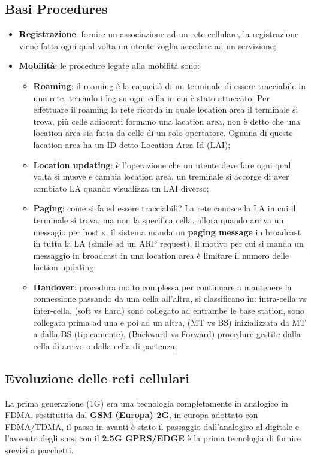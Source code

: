 \documentclass[12pt]{article}
\begin{document}
\subsection{Basi Procedures}
\begin{itemize}
    \item \textbf{Registrazione}: fornire un associazione ad un rete cellulare, la registrazione viene fatta ogni qual volta un utente voglia accedere ad un servizione;
    \item \textbf{Mobilit\`a}: le procedure legate alla mobilit\`a sono:
        \begin{itemize}
            \item \textbf{Roaming}: il roaming \`e la capacit\`a di un terminale di essere tracciabile in una rete, tenendo i log su ogni cella in cui \`e stato attaccato. Per effettuare il roaming la rete ricorda in quale location area il terminale si trova, pi\`u celle adiacenti formano una lacation area, non \`e detto che una location area sia fatta da celle di un solo opertatore. Ognuna di queste lacation area ha un ID detto Location Area Id (LAI);
            \item \textbf{Location updating}: \`e l'operazione che un utente deve fare ogni qual volta si muove e cambia location area, un treminale si accorge di aver cambiato LA quando visualizza un LAI diverso;
            \item \textbf{Paging}: come si fa ed essere tracciabili? La rete conosce la LA in cui il terminale si trova, ma non la specifica cella, allora quando arriva un messagio per host x, il sistema manda un \textbf{paging message} in broadcast in tutta la LA (simile ad un ARP request), il motivo per cui si manda un messaggio in broadcast in una location area \`e limitare il numero delle laction updating;
            \item \textbf{Handover}: procedura molto complessa per continuare a mantenere la connessione passando da una cella all'altra, si classificano in: intra-cella vs inter-cella, (soft vs hard) sono collegato ad entrambe le base station, sono collegato prima ad una e poi ad un altra, (MT vs BS) inizializzata da MT a dalla BS (tipicamente), (Backward vs Forward) procedure gestite dalla cella di arrivo o dalla cella di partenza;
        \end{itemize}
\end{itemize}

\subsection{Evoluzione delle reti cellulari}
La prima generazione (1G) era una tecnologia completamente in analogico in FDMA, sostitutita dal \textbf{GSM (Europa) 2G}, in europa adottato con FDMA/TDMA, il passo in avanti \`e stato il passaggio dall'analogico al digitale e l'avvento degli sms, con il \textbf{2.5G GPRS/EDGE} \`e la prima tecnologia di fornire srevizi a pacchetti.
\end{document}
